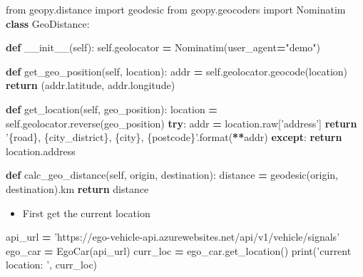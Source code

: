 \documentclass[]{book}
\newenvironment{Shaded}{\begin{snugshade}}{\end{snugshade}}
\newcommand{\BuiltInTok}[1]{#1}
\newcommand{\ControlFlowTok}[1]{\textcolor[rgb]{0.13,0.29,0.53}{\textbf{#1}}}
\newcommand{\FunctionTok}[1]{\textcolor[rgb]{0.00,0.00,0.00}{#1}}
\newcommand{\ImportTok}[1]{#1}
\newcommand{\KeywordTok}[1]{\textcolor[rgb]{0.13,0.29,0.53}{\textbf{#1}}}
\newcommand{\NormalTok}[1]{#1}
\newcommand{\OperatorTok}[1]{\textcolor[rgb]{0.81,0.36,0.00}{\textbf{#1}}}
\newcommand{\SpecialCharTok}[1]{\textcolor[rgb]{0.00,0.00,0.00}{#1}}
\newcommand{\StringTok}[1]{\textcolor[rgb]{0.31,0.60,0.02}{#1}}
\newcommand{\VariableTok}[1]{\textcolor[rgb]{0.00,0.00,0.00}{#1}}
\providecommand{\tightlist}{%
  \setlength{\itemsep}{0pt}\setlength{\parskip}{0pt}}
\begin{document}
\begin{Shaded}
\begin{Highlighting}[]
\ImportTok{from}\NormalTok{ geopy.distance }\ImportTok{import}\NormalTok{ geodesic}
\ImportTok{from}\NormalTok{ geopy.geocoders }\ImportTok{import}\NormalTok{ Nominatim}
\KeywordTok{class}\NormalTok{ GeoDistance:}
    
    \KeywordTok{def} \FunctionTok{__init__}\NormalTok{(}\VariableTok{self}\NormalTok{):}
        \VariableTok{self}\NormalTok{.geolocator }\OperatorTok{=}\NormalTok{ Nominatim(user_agent}\OperatorTok{=}\StringTok{"demo"}\NormalTok{)}
        
    \KeywordTok{def}\NormalTok{ get_geo_position(}\VariableTok{self}\NormalTok{, location):}
\NormalTok{        addr }\OperatorTok{=} \VariableTok{self}\NormalTok{.geolocator.geocode(location)}
        \ControlFlowTok{return}\NormalTok{ (addr.latitude, addr.longitude)}
    
    \KeywordTok{def}\NormalTok{ get_location(}\VariableTok{self}\NormalTok{, geo_position):}
\NormalTok{        location }\OperatorTok{=} \VariableTok{self}\NormalTok{.geolocator.reverse(geo_position)}
        \ControlFlowTok{try}\NormalTok{:}
\NormalTok{            addr }\OperatorTok{=}\NormalTok{ location.raw[}\StringTok{'address'}\NormalTok{]}
            \ControlFlowTok{return} \StringTok{'}\SpecialCharTok{\{road\}}\StringTok{, }\SpecialCharTok{\{city_district\}}\StringTok{, }\SpecialCharTok{\{city\}}\StringTok{, }\SpecialCharTok{\{postcode\}}\StringTok{'}\NormalTok{.}\BuiltInTok{format}\NormalTok{(}\OperatorTok{**}\NormalTok{addr)}
        \ControlFlowTok{except}\NormalTok{:}
            \ControlFlowTok{return}\NormalTok{ location.address}
            
    \KeywordTok{def}\NormalTok{ calc_geo_distance(}\VariableTok{self}\NormalTok{, origin, destination):}
\NormalTok{        distance }\OperatorTok{=}\NormalTok{ geodesic(origin, destination).km}
        \ControlFlowTok{return}\NormalTok{ distance}
        
\end{Highlighting}
\end{Shaded}

\begin{itemize}
\tightlist
\item
  First get the current location
\end{itemize}

\begin{Shaded}
\begin{Highlighting}[]
\NormalTok{api_url }\OperatorTok{=} \StringTok{'https://ego-vehicle-api.azurewebsites.net/api/v1/vehicle/signals'}
\NormalTok{ego_car }\OperatorTok{=}\NormalTok{ EgoCar(api_url)}
\NormalTok{curr_loc }\OperatorTok{=}\NormalTok{ ego_car.get_location()}
\BuiltInTok{print}\NormalTok{(}\StringTok{'current location: '}\NormalTok{, curr_loc)}
\end{Highlighting}
\end{Shaded}
\end{document}
